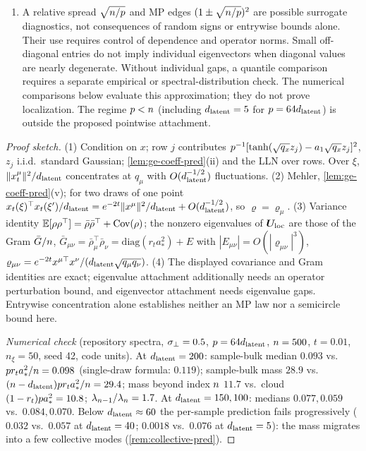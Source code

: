 \begin{proposition}
\begin{enumerate}
\item A relative spread $\sqrt{n/p}$ and MP edges $(1\pm\sqrt{n/p})^2$ are possible surrogate diagnostics, not consequences of random signs or entrywise bounds alone. Their use requires control of dependence and operator norms. Small off-diagonal entries do not imply individual eigenvectors when diagonal values are nearly degenerate. Without individual gaps, a quantile comparison requires a separate empirical or spectral-distribution check. The numerical comparisons below evaluate this approximation; they do not prove localization. The regime $p<n$ (including $d_{\mathrm{latent}}=5$ for $p=64d_{\mathrm{latent}}$) is outside the proposed pointwise attachment.

\end{enumerate}
\end{proposition}
\begin{proof}[Proof sketch]
(1) Condition on $x$; row $j$ contributes $p^{-1}[\tanh(\sqrt{q_x}z_j)-a_1\sqrt{q_x}z_j]^2$, $z_j$ i.i.d.\ standard Gaussian; \cref{lem:ge-coeff-pred}(ii) and the LLN over rows. Over $\xi$, $\|x_t^\mu\|^2/d_{\mathrm{latent}}$ concentrates at $q_\mu$ with $O(d_{\mathrm{latent}}^{-1/2})$ fluctuations. (2) Mehler, \cref{lem:ge-coeff-pred}(v); for two draws of one point $x_t(\xi)^\top x_t(\xi')/d_{\mathrm{latent}}=e^{-2t}\|x^\mu\|^2/d_{\mathrm{latent}}+O(d_{\mathrm{latent}}^{-1/2})$, so $\varrho=\varrho_\mu$. (3) Variance identity $\mathbb{E}[\rho\rho^\top]=\bar\rho\bar\rho^\top+\mathrm{Cov}(\rho)$; the nonzero eigenvalues of $\bm{U}_{\rm loc}$ are those of the Gram $\bar G/n$, $\bar G_{\mu\nu}=\bar\rho_\mu^\top\bar\rho_\nu=\mathrm{diag}(r_ta_*^2)+E$ with $|E_{\mu\nu}|=O(|\varrho_{\mu\nu}|^3)$, $\varrho_{\mu\nu}=e^{-2t}x^{\mu\top}x^\nu/(d_{\mathrm{latent}}\sqrt{q_\mu q_\nu})$. (4) The displayed covariance and Gram identities are exact; eigenvalue attachment additionally needs an operator perturbation bound, and eigenvector attachment needs eigenvalue gaps. Entrywise concentration alone establishes neither an MP law nor a semicircle bound here.

\emph{Numerical check} (repository spectra, $\sigma_{\perp}=0.5$, $p=64d_{\mathrm{latent}}$, $n=500$, $t=0.01$, $n_\xi=50$, seed 42, code units). At $d_{\mathrm{latent}}=200$: sample-bulk median $0.093$ vs.\ $p r_ta_*^2/n=0.098$ (single-draw formula: $0.119$); sample-bulk mass $28.9$ vs.\ $(n-d_{\mathrm{latent}})p r_ta_*^2/n=29.4$; mass beyond index $n$ $11.7$ vs.\ cloud $(1-r_t)p a_*^2=10.8$; $\lambda_{n-1}/\lambda_{n}=1.7$. At $d_{\mathrm{latent}}=150,100$: medians $0.077,0.059$ vs.\ $0.084,0.070$. Below $d_{\mathrm{latent}}\approx60$ the per-sample prediction fails progressively ($0.032$ vs.\ $0.057$ at $d_{\mathrm{latent}}=40$; $0.0018$ vs.\ $0.076$ at $d_{\mathrm{latent}}=5$): the mass migrates into a few collective modes (\cref{rem:collective-pred}).
\end{proof}

